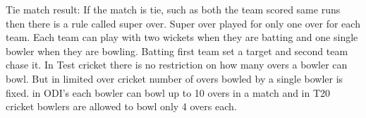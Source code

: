 Tie match result: If the match is tie, such as both the team scored same runs then there is a rule called super over. Super over played for only one over for each team. Each team can play with two wickets when they are batting and one single bowler when they are bowling. Batting first team set a target and second team chase it.
In Test cricket there is no restriction on how many overs a bowler can bowl. But in limited over cricket number of overs bowled by a single bowler is fixed. in ODI's each bowler can bowl up to 10 overs in a match and in T20 cricket bowlers are allowed to bowl only 4 overs each.

